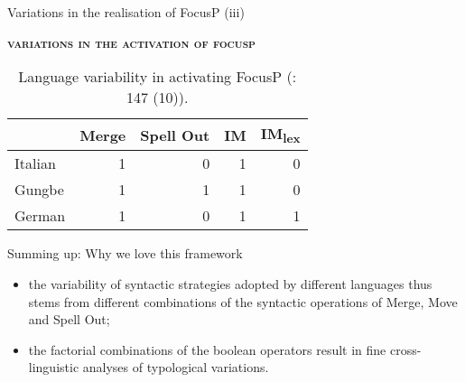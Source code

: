 \documentclass[lesson_slides]{subfiles}
\begin{document}
\begin{frame}[c]{Variations in the realisation of FocusP (iii)}

    \noindent \textbf{\textsc{variations in the activation of focusp}} 
    \begin{table}[H]
    \centering
        \begin{tabular}{|l|r|r|r|r|}
        \hline
         & Merge & Spell Out & IM & IM\textsubscript{lex} \\
        \hline
        Italian & 1 & 0 & 1 & 0 \\
        \hline
        Gungbe & 1 & 1 & 1 & 0 \\
        \hline
        German & 1 & 0 & 1 & 1 \\
        \hline
        \end{tabular}
    \caption{\label{tab:samp}Language variability in activating FocusP (\cite{samo2019cartography}: 147 (10)).}
    \end{table}

\end{frame}
\begin{frame}{Summing up: Why we love this framework}

    \begin{itemize}
        \item[\ding{227}] the variability of syntactic strategies adopted by different languages thus stems from different combinations of the syntactic operations of Merge, Move and Spell Out; \pause
        \item[\ding{227}] the factorial combinations of the boolean operators result in fine cross-linguistic analyses of typological variations. 
    \end{itemize}
    
\end{frame}
\end{document}
